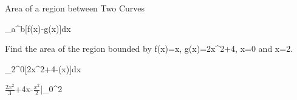 \documentclass{article}
\begin{document}
 Area of a region between Two Curves

 \int_{a}^b[f(x)-g(x)]dx

 Find the area of the region bounded by f(x)=x, g(x)=2x^2+4, x=0 and x=2.

 \int_{2}^0[2x^2+4-(x)]dx

 $\frac{2x^2}{3}$+4x-$\frac{x^2}{2}$|_{0}^2
\end{document}
